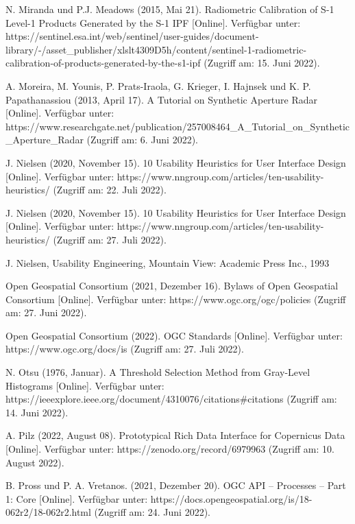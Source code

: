 \begin{thebibliography}{1}
N. Miranda und P.J. Meadows (2015, Mai 21). Radiometric Calibration of S-1 Level-1 Products Generated by the S-1 IPF [Online]. Verfügbar unter: 
https://sentinel.esa.int/web/sentinel/user-guides/document-library/-/asset\_publisher/xlslt4309D5h/content/sentinel-1-radiometric-calibration-of-products-generated-by-the-s1-ipf
(Zugriff am: 15. Juni 2022).

A. Moreira, M. Younis, P. Prats-Iraola, G. Krieger, I. Hajnsek und K. P. Papathanassiou (2013, April 17). A Tutorial on Synthetic Aperture Radar [Online]. Verfügbar unter: 
https://www.researchgate.net/publication/257008464\_A\_Tutorial\_on\_Synthetic\_Aperture\_Radar
(Zugriff am: 6. Juni 2022).

J. Nielsen (2020, November 15). 10 Usability Heuristics for User Interface Design [Online]. Verfügbar unter: 
https://www.nngroup.com/articles/ten-usability-heuristics/
(Zugriff am: 22. Juli 2022).

J. Nielsen (2020, November 15). 10 Usability Heuristics for User Interface Design [Online]. Verfügbar unter: 
https://www.nngroup.com/articles/ten-usability-heuristics/
(Zugriff am: 27. Juli 2022).

J. Nielsen, Usability Engineering, Mountain View: Academic Press Inc., 1993

Open Geospatial Consortium (2021, Dezember 16). Bylaws of Open Geospatial Consortium [Online]. Verfügbar unter: 
https://www.ogc.org/ogc/policies
(Zugriff am: 27. Juni 2022).

Open Geospatial Consortium (2022). OGC Standards [Online]. Verfügbar unter: 
https://www.ogc.org/docs/is
(Zugriff am: 27. Juli 2022).

N. Otsu (1976, Januar). A Threshold Selection Method from Gray-Level Histograms [Online]. Verfügbar unter: 
https://ieeexplore.ieee.org/document/4310076/citations\#citations
(Zugriff am: 14. Juni 2022).

A. Pilz (2022, August 08). Prototypical Rich Data Interface for Copernicus Data [Online]. Verfügbar unter: 
https://zenodo.org/record/6979963
(Zugriff am: 10. August 2022).

B. Pross und P. A. Vretanos. (2021, Dezember 20). OGC API – Processes – Part 1: Core [Online]. Verfügbar unter: 
https://docs.opengeospatial.org/is/18-062r2/18-062r2.html 
(Zugriff am: 24. Juni 2022).


\end{thebibliography}
